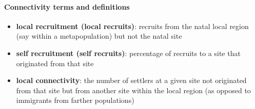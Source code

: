 \documentclass[12pt, oneside]{article}   	%
\begin{document}
\paragraph*{Connectivity terms and definitions}
\begin{itemize}
\item \textbf{local recruitment (local recruits)}: recruits from the natal local region (say within a metapopulation) but not the natal site \citep{saenz2011connectivity}
\item \textbf{self recruitment (self recruits)}: percentage of recruits to a site that originated from that site \citep{saenz2011connectivity}
\item \textbf{local connectivity}: the number of settlers at a given site not originated from that site but from another site within the local region (as opposed to immigrants from farther populations) \citep{saenz2011connectivity}
\end{itemize}
\end{document}
